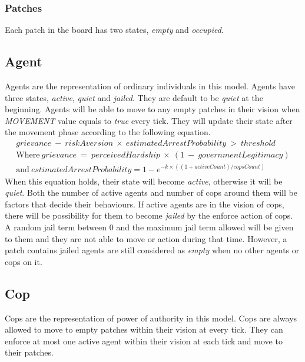 \documentclass[11pt]{article}
\begin{document}
        \subsubsection{Patches}
        Each patch in the board has two states, \textit{empty} and \textit{occupied}.
        \subsection{Agent}
        Agents are the representation of ordinary individuals in this model. Agents
        have three states, \textit{active}, \textit{quiet} and \textit{jailed}. 
        They are default to be \textit{quiet} at the beginning. Agents will be able
        to move to any empty patches in their vision when \textit{MOVEMENT} value
        equals to \textit{true} every tick. They will update their state after the
        movement phase according to the following equation.
        \begin{equation}
            \begin{split}
                grievance\:-\:riskAversion\:\times\:estimatedArrestProbability\:>\:threshold \\
                \text{Where}\ grievance\:=\:perceivedHardship\:\times\:(1\:-\:governmentLegitimacy)\\
                \text{and}\ estimatedArrestProbability = 1 - e^{-k \times ((1 + activeCount) / copsCount)}
            \end{split}
        \end{equation}  
        When this equation holds, their state will become \textit{active}, otherwise
        it will be \textit{quiet}. Both the number of active agents and number of
        cops around them will be factors that decide their behaviours.
        If active agents are in the vision of cops, there
        will be possibility for them to become \textit{jailed} by the enforce action
        of cops. A random jail term between 0 and the maximum jail term allowed will
        be given to them and they are not able to move or action during that time.
        However, a patch contains jailed agents are still considered as \textit{empty}
        when no other agents or cops on it.
        \subsection{Cop}
        Cops are the representation of power of authority in this model. Cops
        are always allowed to move to empty patches within their vision at 
        every tick. They can enforce at most one active agent within their vision
        at each tick and move to their patches.
\end{document}
